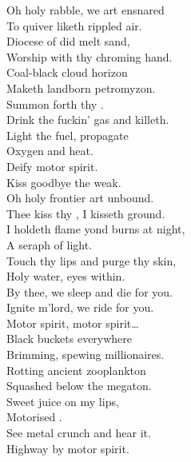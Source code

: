 \subtitle{%
    or, Dawn of Eternal Night:
	An Annihilation of Planet Earth and the Beginning of Merciless Damnation \\
}

\label{album:petrodragonic-apocalypse}




Oh holy rabble, we art ensnared \\
To quiver liketh rippled air. \\
Diocese of did melt sand, \\
Worship with thy chroming hand. \\
Coal-black cloud horizon \\
Maketh landborn petromyzon. \\
Summon forth thy . \\
Drink the fuckin' gas and killeth. \\

Light the fuel, propagate \\
Oxygen and heat. \\
Deify motor spirit. \\
Kiss goodbye the weak. \\

Oh holy frontier art unbound. \\
Thee kiss thy , I kisseth ground. \\
I holdeth flame yond burns at night, \\
A seraph of  light. \\
Touch thy lips and purge thy skin, \\
Holy water, eyes within. \\
By thee, we sleep and die for you. \\
Ignite m'lord, we ride for you. \\

Motor spirit, motor spirit… \\

Black buckets everywhere \\
Brimming, spewing millionaires. \\
Rotting ancient zooplankton \\
Squashed below the megaton. \\
Sweet juice on my lips, \\
Motorised . \\
See metal crunch and hear it. \\
Highway  by motor spirit. \\

